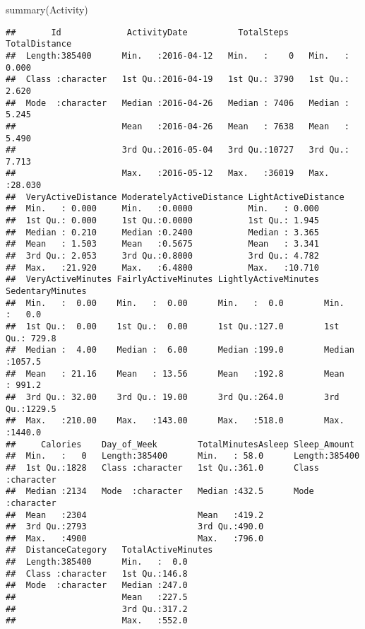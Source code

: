 \documentclass[
]{article}
\newenvironment{Shaded}{\begin{snugshade}}{\end{snugshade}}
\newcommand{\FunctionTok}[1]{\textcolor[rgb]{0.00,0.00,0.00}{#1}}
\newcommand{\NormalTok}[1]{#1}
\begin{document}
\begin{Shaded}
\begin{Highlighting}[]
\FunctionTok{summary}\NormalTok{(Activity)}
\end{Highlighting}
\end{Shaded}

\begin{verbatim}
##       Id             ActivityDate          TotalSteps    TotalDistance   
##  Length:385400      Min.   :2016-04-12   Min.   :    0   Min.   : 0.000  
##  Class :character   1st Qu.:2016-04-19   1st Qu.: 3790   1st Qu.: 2.620  
##  Mode  :character   Median :2016-04-26   Median : 7406   Median : 5.245  
##                     Mean   :2016-04-26   Mean   : 7638   Mean   : 5.490  
##                     3rd Qu.:2016-05-04   3rd Qu.:10727   3rd Qu.: 7.713  
##                     Max.   :2016-05-12   Max.   :36019   Max.   :28.030  
##  VeryActiveDistance ModeratelyActiveDistance LightActiveDistance
##  Min.   : 0.000     Min.   :0.0000           Min.   : 0.000     
##  1st Qu.: 0.000     1st Qu.:0.0000           1st Qu.: 1.945     
##  Median : 0.210     Median :0.2400           Median : 3.365     
##  Mean   : 1.503     Mean   :0.5675           Mean   : 3.341     
##  3rd Qu.: 2.053     3rd Qu.:0.8000           3rd Qu.: 4.782     
##  Max.   :21.920     Max.   :6.4800           Max.   :10.710     
##  VeryActiveMinutes FairlyActiveMinutes LightlyActiveMinutes SedentaryMinutes
##  Min.   :  0.00    Min.   :  0.00      Min.   :  0.0        Min.   :   0.0  
##  1st Qu.:  0.00    1st Qu.:  0.00      1st Qu.:127.0        1st Qu.: 729.8  
##  Median :  4.00    Median :  6.00      Median :199.0        Median :1057.5  
##  Mean   : 21.16    Mean   : 13.56      Mean   :192.8        Mean   : 991.2  
##  3rd Qu.: 32.00    3rd Qu.: 19.00      3rd Qu.:264.0        3rd Qu.:1229.5  
##  Max.   :210.00    Max.   :143.00      Max.   :518.0        Max.   :1440.0  
##     Calories    Day_of_Week        TotalMinutesAsleep Sleep_Amount      
##  Min.   :   0   Length:385400      Min.   : 58.0      Length:385400     
##  1st Qu.:1828   Class :character   1st Qu.:361.0      Class :character  
##  Median :2134   Mode  :character   Median :432.5      Mode  :character  
##  Mean   :2304                      Mean   :419.2                        
##  3rd Qu.:2793                      3rd Qu.:490.0                        
##  Max.   :4900                      Max.   :796.0                        
##  DistanceCategory   TotalActiveMinutes
##  Length:385400      Min.   :  0.0     
##  Class :character   1st Qu.:146.8     
##  Mode  :character   Median :247.0     
##                     Mean   :227.5     
##                     3rd Qu.:317.2     
##                     Max.   :552.0
\end{verbatim}
\end{document}
